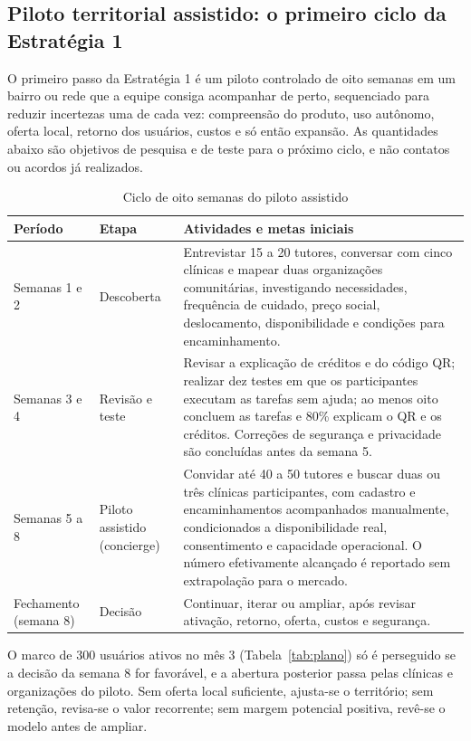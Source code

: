 \subsection{Piloto territorial assistido: o primeiro ciclo da Estratégia 1}
\label{sub:piloto}

O primeiro passo da Estratégia 1 é um piloto controlado de oito semanas em um bairro ou rede que a equipe consiga acompanhar de perto, sequenciado para reduzir incertezas uma de cada vez: compreensão do produto, uso autônomo, oferta local, retorno dos usuários, custos e só então expansão. As quantidades abaixo são objetivos de pesquisa e de teste para o próximo ciclo, e não contatos ou acordos já realizados.

\begin{table}[htb]
\centering
\caption{Ciclo de oito semanas do piloto assistido}
\label{tab:ciclo}
\begin{tabularx}{\textwidth}{L{2.2cm} L{2.8cm} Y}
\toprule
\textbf{Período} & \textbf{Etapa} & \textbf{Atividades e metas iniciais}\\
\midrule
Semanas 1 e 2 & Descoberta & Entrevistar 15 a 20 tutores, conversar com cinco clínicas e mapear duas organizações comunitárias, investigando necessidades, frequência de cuidado, preço social, deslocamento, disponibilidade e condições para encaminhamento.\\
Semanas 3 e 4 & Revisão e teste & Revisar a explicação de créditos e do código QR; realizar dez testes em que os participantes executam as tarefas sem ajuda; ao menos oito concluem as tarefas e 80\% explicam o QR e os créditos. Correções de segurança e privacidade são concluídas antes da semana 5.\\
Semanas 5 a 8 & Piloto assistido (concierge) & Convidar até 40 a 50 tutores e buscar duas ou três clínicas participantes, com cadastro e encaminhamentos acompanhados manualmente, condicionados a disponibilidade real, consentimento e capacidade operacional. O número efetivamente alcançado é reportado sem extrapolação para o mercado.\\
Fechamento (semana 8) & Decisão & Continuar, iterar ou ampliar, após revisar ativação, retorno, oferta, custos e segurança.\\
\bottomrule
\end{tabularx}
\fonteautores
\end{table}

O marco de 300 usuários ativos no mês 3 (Tabela~\ref{tab:plano}) só é perseguido se a decisão da semana 8 for favorável, e a abertura posterior passa pelas clínicas e organizações do piloto. Sem oferta local suficiente, ajusta-se o território; sem retenção, revisa-se o valor recorrente; sem margem potencial positiva, revê-se o modelo antes de ampliar.

